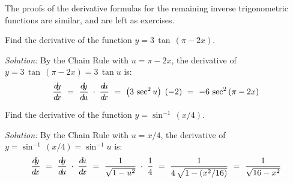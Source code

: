 \noindent The proofs of the derivative formulas for the remaining inverse
trigonometric functions are similar, and are left as exercises.

\begin{exmp}\label{exmp:derivtanpi2x}
 Find the derivative of the function $y = 3\,\tan\,(\pi - 2x)$.\vspace{1mm}
 \par\noindent\emph{Solution:} By the Chain Rule with $u = \pi - 2x$, the derivative of
 $y = 3\,\tan\,(\pi - 2x) = 3\,\tan u$ is:
 \begin{displaymath}
  \frac{d\negmedspace y}{d\!x} ~=~ \frac{d\negmedspace y}{d\!u} \;\cdot\; \frac{d\negmedspace u}{d\!x} ~=~ \left(3\,\sec^2 u\right) \; (-2) ~=~ -6\,\sec^2\,(\pi - 2x)
 \end{displaymath}
\end{exmp}
\begin{exmp}\label{exmp:derivasinx4}
 Find the derivative of the function $y = \sin^{-1}\,(x/4)$.\vspace{1mm}
 \par\noindent\emph{Solution:} By the Chain Rule with $u = x/4$, the derivative of
 $y = \sin^{-1}\,(x/4) = \sin^{-1} u$ is:
 \[
  \frac{d\negmedspace y}{d\!x} ~=~ \frac{d\negmedspace y}{d\!u} \;\cdot\; \frac{d\negmedspace u}{d\!x} ~=~ \frac{1}{\sqrt{1 - u^2}} \;\cdot\; \frac{1}{4} ~=~
  \frac{1}{4\,\sqrt{1 - (x^2/16)}} ~=~ \frac{1}{\sqrt{16 - x^2}}
 \]
\end{exmp}
\divider
\vspace{3mm}
\startexercises\label{sec2dot2}
